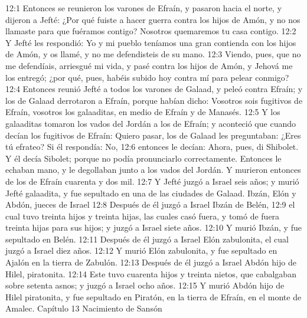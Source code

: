 12:1 Entonces se reunieron los varones de Efraín, y pasaron hacia el norte, y dijeron a Jefté: ¿Por qué fuiste a hacer guerra contra los hijos de Amón, y no nos llamaste para que fuéramos contigo? Nosotros quemaremos tu casa contigo.  
12:2 Y Jefté les respondió: Yo y mi pueblo teníamos una gran contienda con los hijos de Amón, y os llamé, y no me defendisteis de su mano.  
12:3 Viendo, pues, que no me defendíais, arriesgué mi vida, y pasé contra los hijos de Amón, y Jehová me los entregó; ¿por qué, pues, habéis subido hoy contra mí para pelear conmigo?  
12:4 Entonces reunió Jefté a todos los varones de Galaad, y peleó contra Efraín; y los de Galaad derrotaron a Efraín, porque habían dicho: Vosotros sois fugitivos de Efraín, vosotros los galaaditas, en medio de Efraín y de Manasés.  
12:5 Y los galaaditas tomaron los vados del Jordán a los de Efraín; y aconteció que cuando decían los fugitivos de Efraín: Quiero pasar, los de Galaad les preguntaban: ¿Eres tú efrateo? Si él respondía: No,  
12:6 entonces le decían: Ahora, pues, di Shibolet. Y él decía Sibolet; porque no podía pronunciarlo correctamente. Entonces le echaban mano, y le degollaban junto a los vados del Jordán. Y murieron entonces de los de Efraín cuarenta y dos mil.  
12:7 Y Jefté juzgó a Israel seis años; y murió Jefté galaadita, y fue sepultado en una de las ciudades de Galaad.  
Ibzán, Elón y Abdón, jueces de Israel  
12:8 Después de él juzgó a Israel Ibzán de Belén,  
12:9 el cual tuvo treinta hijos y treinta hijas, las cuales casó fuera, y tomó de fuera treinta hijas para sus hijos; y juzgó a Israel siete años.  
12:10 Y murió Ibzán, y fue sepultado en Belén.  
12:11 Después de él juzgó a Israel Elón zabulonita, el cual juzgó a Israel diez años.  
12:12 Y murió Elón zabulonita, y fue sepultado en Ajalón en la tierra de Zabulón.  
12:13 Después de él juzgó a Israel Abdón hijo de Hilel, piratonita.  
12:14 Este tuvo cuarenta hijos y treinta nietos, que cabalgaban sobre setenta asnos; y juzgó a Israel ocho años.  
12:15 Y murió Abdón hijo de Hilel piratonita, y fue sepultado en Piratón, en la tierra de Efraín, en el monte de Amalec.  
Capítulo 13
Nacimiento de Sansón  

